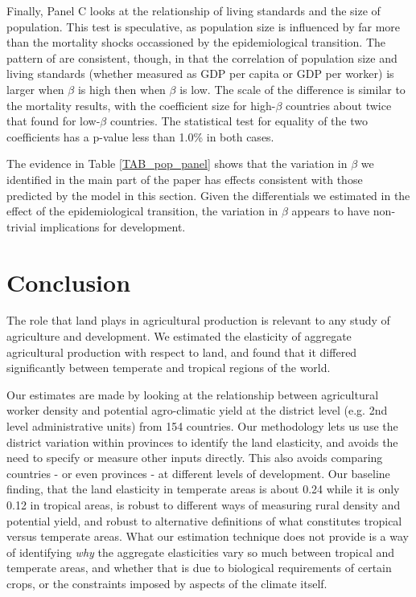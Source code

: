 \documentclass[11pt]{article}
\begin{document}
Finally, Panel C looks at the relationship of living standards and the size of population. This test is speculative, as population size is influenced by far more than the mortality shocks occassioned by the epidemiological transition. The pattern of are consistent, though, in that the correlation of population size and living standards (whether measured as GDP per capita or GDP per worker) is larger when $\beta$ is high then when $\beta$ is low. The scale of the difference is similar to the mortality results, with the coefficient size for high-$\beta$ countries about twice that found for low-$\beta$ countries. The statistical test for equality of the two coefficients has a p-value less than 1.0\% in both cases.

The evidence in Table \ref{TAB_pop_panel} shows that the variation in $\beta$ we identified in the main part of the paper has effects consistent with those predicted by the model in this section. Given the differentials we estimated in the effect of the epidemiological transition, the variation in $\beta$ appears to have non-trivial implications for development.

\section{Conclusion}
The role that land plays in agricultural production is relevant to any study of agriculture and development. We estimated the elasticity of aggregate agricultural production with respect to land, and found that it differed significantly between temperate and tropical regions of the world.

Our estimates are made by looking at the relationship between agricultural worker density and potential agro-climatic yield at the district level (e.g. 2nd level administrative units) from 154 countries. Our methodology lets us use the district variation within provinces to identify the land elasticity, and avoids the need to specify or measure other inputs directly. This also avoids comparing countries - or even provinces - at different levels of development. Our baseline finding, that the land elasticity in temperate areas is about 0.24 while it is only 0.12 in tropical areas, is robust to different ways of measuring rural density and potential yield, and robust to alternative definitions of what constitutes tropical versus temperate areas. What our estimation technique does not provide is a way of identifying \textit{why} the aggregate elasticities vary so much between tropical and temperate areas, and whether that is due to biological requirements of certain crops, or the constraints imposed by aspects of the climate itself.
\end{document}
